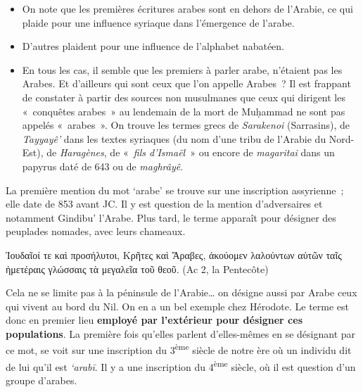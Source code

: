 \begin{itemize}
\item
  On note que les premières écritures arabes sont en dehors de l'Arabie,
  ce qui plaide pour une influence syriaque dans l'émergence de l'arabe.
\item
  D'autres plaident pour une influence de l'alphabet
  nabatéen.
\item
  En tous les cas, il semble que les premiers à parler arabe, n'étaient
  pas les Arabes. Et d'ailleurs qui sont ceux que l'on appelle Arabes~?
  Il est frappant de constater à partir des sources non musulmanes que
  ceux qui dirigent les «~conquêtes arabes~» au lendemain de la mort de
  Muḥammad ne sont pas appelés «~arabes~». On trouve les termes grecs de
  \emph{Sarakenoi} (Sarrasins), de \emph{Tayyayê'} dans les textes
  syriaques (du nom d'une tribu de l'Arabie du Nord-Est), de
  \emph{Haragènes}, de «~\emph{fils d'Ismaël}~» ou encore de
  \emph{magaritai} dans un papyrus daté de 643 ou de
  \emph{maghrâyê}.
\end{itemize}

La première mention du mot `arabe' se trouve sur une inscription
assyrienne~; elle date de 853 avant JC. Il y est question de la mention
d'adversaires et notamment Gindibu' l'Arabe. Plus tard, le terme
apparaît pour désigner des peuplades nomades, avec leurs chameaux.

\foreignlanguage{greek}{
Ἰουδαῖοί τε καὶ προσήλυτοι, Κρῆτες καὶ Ἄραβες, ἀκούομεν
λαλούντων αὐτῶν ταῖς ἡμετέραις γλώσσαις τὰ μεγαλεῖα τοῦ θεοῦ.} (Ac 2, la
Pentecôte)



Cela ne se limite pas à la péninsule de l'Arabie\ldots{} on désigne
aussi par Arabe ceux qui vivent au bord du Nil. On en a un bel exemple
chez Hérodote. Le terme est donc en premier lieu \textbf{employé par
l'extérieur pour désigner ces populations}. La première fois qu'elles
parlent d'elles-mêmes en se désignant par ce mot, se voit sur une
inscription du 3\textsuperscript{ème} siècle de notre ère où un individu
dit de lui qu'il est \emph{`arabī}. Il y a une inscription du
4\textsuperscript{ème} siècle, où il est question d'un groupe d'arabes.

